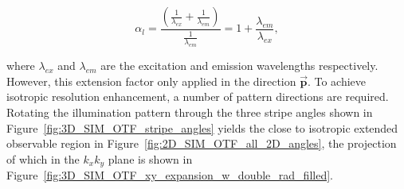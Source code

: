 \begin{equation}\label{eq:lateral_res_extension_factor}
\alpha_{l} = \frac{\left(\frac{1}{\lambda_{ex}} + \frac{1}{\lambda_{em}}\right)}{\frac{1}{\lambda_{em}}} = 1 + \frac{\lambda_{em}}{\lambda_{ex}},
\end{equation}

where $\lambda_{ex}$ and $\lambda_{em}$ are the excitation and emission
wavelengths respectively.  However, this extension factor only applied in 
the direction $\overrightarrow{\textbf{p}}$. To achieve isotropic 
resolution enhancement, a number of pattern directions are required. 
Rotating the illumination pattern through the three stripe angles shown 
in Figure~\ref{fig:3D_SIM_OTF_stripe_angles} yields the close to isotropic extended 
observable region in Figure~\ref{fig:2D_SIM_OTF_all_2D_angles}, the 
projection of which in the $k_{x}k_{y}$ plane is shown in
Figure~\ref{fig:3D_SIM_OTF_xy_expansion_w_double_rad_filled}. 


